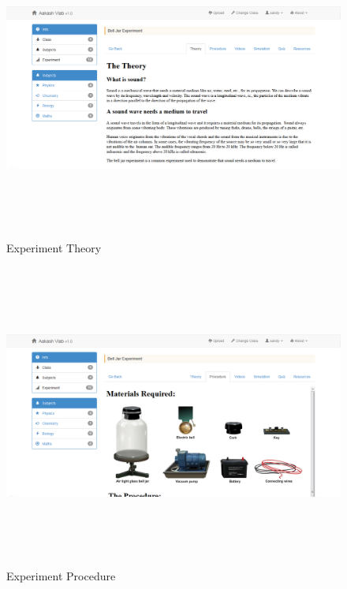 \documentclass[12pt]{report}
\begin{document}
\begin{figure}[H]
 \centering 
 \includegraphics[width=15cm, height=10cm]{./305.jpg}
 \caption{Experiment Theory\label{fig:305}}
\end{figure}
\begin{figure}[H]
 \centering 
 \includegraphics[width=15cm, height=10cm]{./306.jpg}
 \caption{Experiment Procedure\label{fig:306}}
\end{figure}
\end{document}
